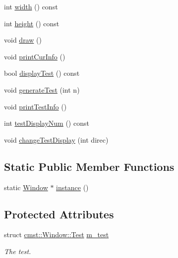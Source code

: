 \begin{DoxyCompactItemize}
int \hyperlink{classcmst_1_1_window_a5fc4ccbd9afed56cd17d341269028da2}{width} () const 
\item 
int \hyperlink{classcmst_1_1_window_a6fc02b2afee52c0f71b6a3bd39c9210f}{height} () const 
\item 
void \hyperlink{classcmst_1_1_window_a1d78ef796691e87ed3b4978f373c9890}{draw} ()
\item 
void \hyperlink{classcmst_1_1_window_a73eb23d7d7418cb288022e623e590461}{print\+Cur\+Info} ()
\item 
bool \hyperlink{classcmst_1_1_window_aa3f5edeebdd298190bdb4676b4838f75}{display\+Test} () const 
\item 
void \hyperlink{classcmst_1_1_window_acda99115d9c67f83de4d8f5a94f2647c}{generate\+Test} (int n)
\item 
void \hyperlink{classcmst_1_1_window_a471e1648f99754f7c2cbfbbb1e8ab556}{print\+Test\+Info} ()
\item 
int \hyperlink{classcmst_1_1_window_ae456c1bf45fc28133390fcc881fbd612}{test\+Display\+Num} () const 
\item 
void \hyperlink{classcmst_1_1_window_aa8dc3725888e12fc2c6e3626ab7b600a}{change\+Test\+Display} (int direc)
\end{DoxyCompactItemize}
\subsection*{Static Public Member Functions}
\begin{DoxyCompactItemize}
\item 
static \hyperlink{classcmst_1_1_window}{Window} $\ast$ \hyperlink{classcmst_1_1_window_a281790e82296e7be50c19520f136e345}{instance} ()
\end{DoxyCompactItemize}
\subsection*{Protected Attributes}
\begin{DoxyCompactItemize}
\item 
struct \hyperlink{structcmst_1_1_window_1_1_test}{cmst\+::\+Window\+::\+Test} \hyperlink{classcmst_1_1_window_aedae466fb2efd886cea6d775b20fabe3}{m\+\_\+test}
\begin{DoxyCompactList}\small\item\em The test. \end{DoxyCompactList}\end{DoxyCompactItemize}

